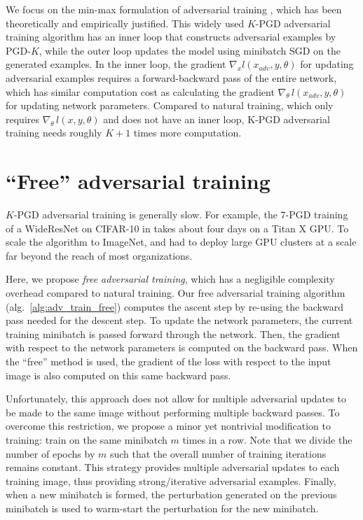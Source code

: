 \documentclass{article}
\begin{document}
We focus on the min-max formulation of adversarial training \citep{madry2017towards}, which has been theoretically and empirically justified. 
 This widely used $K$-PGD adversarial training algorithm 
 has an inner loop that constructs adversarial examples by PGD-$K$, while the outer loop updates the model using minibatch SGD on the generated examples.
 In the inner loop, the gradient $\nabla_x l (x_{adv},y,\theta)$ for updating adversarial examples requires a forward-backward pass of the entire network, which has similar computation cost as calculating the gradient $\nabla_\theta \, l(x_{adv}, y, \theta)$ for updating network parameters. Compared to natural training, which only requires $\nabla_\theta \, l(x, y, \theta)$ and does not have an inner loop, K-PGD adversarial training needs roughly $K+1$ times more computation. 





\section{``Free'' adversarial training}
$K$-PGD adversarial training \citep{madry2017towards} is generally slow. For example, the 7-PGD training of a WideResNet \citep{zagoruyko2016wide} on CIFAR-10 in \cite{madry2017towards} takes about four days on a Titan X GPU. To scale the algorithm to ImageNet, \cite{xie2018feature} and \cite{kannan2018adversarial} had to deploy large GPU clusters at a scale far beyond the reach of most organizations. 

Here, we propose {\em free adversarial training}, which has a negligible complexity overhead compared to natural training. Our free adversarial training algorithm (alg.~\ref{alg:adv_train_free}) computes the ascent step by re-using the backward pass needed for the descent step.
To update the network parameters, the current training minibatch is passed forward through the network.  Then, the gradient with respect to the network parameters is computed on the backward pass. 
When the ``free'' method is used, the gradient of the loss with respect to the input image is also computed on this same backward pass.

Unfortunately, this approach does not allow for multiple adversarial updates to be made to the same image without performing multiple backward passes.
To overcome this restriction, we propose a minor yet nontrivial modification to training: train on the same minibatch $m$ times in a row. Note that we divide the number of epochs by $m$ such that the overall number of training iterations remains constant.  This strategy provides multiple adversarial updates to each training image, thus providing strong/iterative adversarial examples.
Finally, when a new minibatch is formed, the perturbation generated on the previous minibatch is used to warm-start the perturbation for the new minibatch. 
\end{document}
